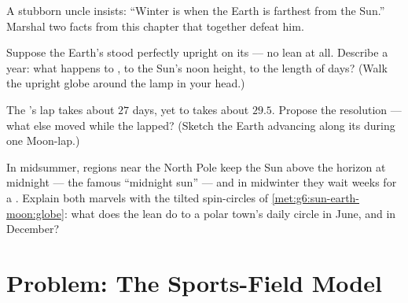 \begin{exercise}[$\star\star$]\label{exo:g6:sun-earth-moon:9}
A stubborn uncle insists: ``Winter is when the Earth is farthest
from the Sun.'' Marshal two facts from this chapter that together
defeat him.
\end{exercise}

\begin{exercise}[$\star\star$]\label{exo:g6:sun-earth-moon:10}
Suppose the Earth's  stood perfectly upright on its  ---
no lean at all. Describe a year: what happens to , to the
Sun's noon height, to the length of days? (Walk the upright globe
around the lamp in your head.)
\end{exercise}

\begin{exercise}[$\star\star$]\label{exo:g6:sun-earth-moon:11}
The 's lap takes about $27$ days, yet  to 
takes about $29.5$. Propose the resolution --- what else moved
while the  lapped? (Sketch the Earth advancing along its
 during one Moon-lap.)
\end{exercise}

\begin{exercise}[$\star\star\star$]\label{exo:g6:sun-earth-moon:12}
In midsummer, regions near the North Pole keep the Sun above the
horizon at midnight --- the famous ``midnight sun'' --- and in
midwinter they wait weeks for a . Explain both marvels
with the tilted spin-circles of
\cref{met:g6:sun-earth-moon:globe}: what does the lean do to a
polar town's daily circle in June, and in December?
\end{exercise}

\section{Problem: The Sports-Field Model}

